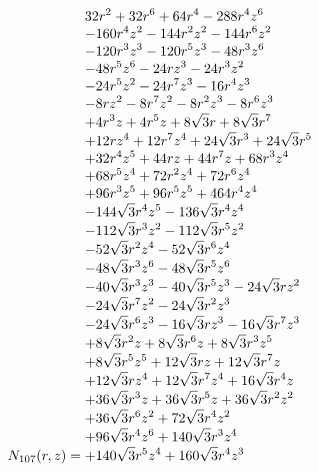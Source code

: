 \documentclass[11pt,a4paper]{article}
\begin{document}
\begin{equation}
N_{107}(r,z)=\shortstack[l]{$\displaystyle 32 r^{2} + 32 r^{6} + 64 r^{4} - 288 r^{4} z^{6}$\\
$\displaystyle  - 160 r^{4} z^{2} - 144 r^{2} z^{2} - 144 r^{6} z^{2}$\\
$\displaystyle  - 120 r^{3} z^{3} - 120 r^{5} z^{3} - 48 r^{3} z^{6}$\\
$\displaystyle  - 48 r^{5} z^{6} - 24 r z^{3} - 24 r^{3} z^{2}$\\
$\displaystyle  - 24 r^{5} z^{2} - 24 r^{7} z^{3} - 16 r^{4} z^{3}$\\
$\displaystyle  - 8 r z^{2} - 8 r^{7} z^{2} - 8 r^{2} z^{3} - 8 r^{6} z^{3}$\\
$\displaystyle  + 4 r^{3} z + 4 r^{5} z + 8 \sqrt{3} r + 8 \sqrt{3} r^{7}$\\
$\displaystyle  + 12 r z^{4} + 12 r^{7} z^{4} + 24 \sqrt{3} r^{3} + 24 \sqrt{3} r^{5}$\\
$\displaystyle  + 32 r^{4} z^{5} + 44 r z + 44 r^{7} z + 68 r^{3} z^{4}$\\
$\displaystyle  + 68 r^{5} z^{4} + 72 r^{2} z^{4} + 72 r^{6} z^{4}$\\
$\displaystyle  + 96 r^{3} z^{5} + 96 r^{5} z^{5} + 464 r^{4} z^{4}$\\
$\displaystyle  - 144 \sqrt{3} r^{4} z^{5} - 136 \sqrt{3} r^{4} z^{4}$\\
$\displaystyle  - 112 \sqrt{3} r^{3} z^{2} - 112 \sqrt{3} r^{5} z^{2}$\\
$\displaystyle  - 52 \sqrt{3} r^{2} z^{4} - 52 \sqrt{3} r^{6} z^{4}$\\
$\displaystyle  - 48 \sqrt{3} r^{3} z^{6} - 48 \sqrt{3} r^{5} z^{6}$\\
$\displaystyle  - 40 \sqrt{3} r^{3} z^{3} - 40 \sqrt{3} r^{5} z^{3} - 24 \sqrt{3} r z^{2}$\\
$\displaystyle  - 24 \sqrt{3} r^{7} z^{2} - 24 \sqrt{3} r^{2} z^{3}$\\
$\displaystyle  - 24 \sqrt{3} r^{6} z^{3} - 16 \sqrt{3} r z^{3} - 16 \sqrt{3} r^{7} z^{3}$\\
$\displaystyle  + 8 \sqrt{3} r^{2} z + 8 \sqrt{3} r^{6} z + 8 \sqrt{3} r^{3} z^{5}$\\
$\displaystyle  + 8 \sqrt{3} r^{5} z^{5} + 12 \sqrt{3} r z + 12 \sqrt{3} r^{7} z$\\
$\displaystyle  + 12 \sqrt{3} r z^{4} + 12 \sqrt{3} r^{7} z^{4} + 16 \sqrt{3} r^{4} z$\\
$\displaystyle  + 36 \sqrt{3} r^{3} z + 36 \sqrt{3} r^{5} z + 36 \sqrt{3} r^{2} z^{2}$\\
$\displaystyle  + 36 \sqrt{3} r^{6} z^{2} + 72 \sqrt{3} r^{4} z^{2}$\\
$\displaystyle  + 96 \sqrt{3} r^{4} z^{6} + 140 \sqrt{3} r^{3} z^{4}$\\
$\displaystyle  + 140 \sqrt{3} r^{5} z^{4} + 160 \sqrt{3} r^{4} z^{3}$}
\label{eq:cat-numerator-107}
\end{equation}
\end{document}
